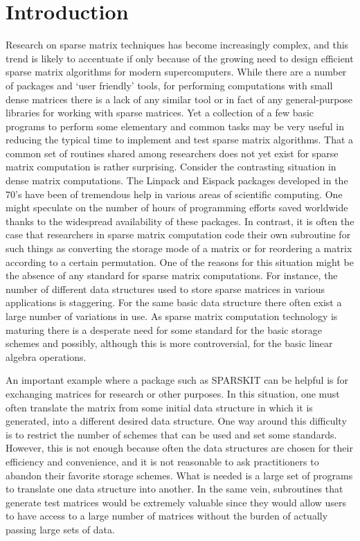 \documentclass[12pt]{article}
\begin{document}
\section{Introduction} Research   on   sparse  matrix   techniques  has  become
increasingly complex, and this trend is likely to accentuate if only
because  of the growing need 
to design efficient sparse matrix algorithms for modern supercomputers.   
While there  are a  number of packages and `user
friendly' tools, for  performing computations  with small dense
matrices there is a lack of any similar tool or in fact of any 
general-purpose libraries for 
working with sparse  matrices.   Yet a  collection of  a few  basic programs to
perform some elementary and  common tasks  may be  very useful  in reducing the
typical time to implement and test sparse matrix algorithms.   That a common 
set
of routines  shared  among  researchers  does not  yet exist for sparse matrix
computation is rather surprising.  Consider the contrasting  situation in dense
matrix computations.  The Linpack  and Eispack  packages developed  in the 70's
have been of tremendous  help in  various areas  of scientific  computing.  
One might speculate on the number of hours of programming efforts 
saved worldwide thanks to the widespread availability  of these  packages.
In contrast,  it is  often the case that  researchers in  sparse  matrix 
computation  
code their own subroutine for  such  things as converting the storage mode
of a matrix or for reordering a matrix
according to a certain permutation.  One of the  reasons for this situation
might be the absence of any standard for sparse
matrix computations.  For instance, the number of different data
structures used to store sparse matrices in various applications is
staggering.  For the same basic data structure there often exist a
large number of variations in use.  As sparse matrix computation
technology is maturing there is a desperate need for some standard for
the basic storage schemes and possibly, although this is more
controversial, for the basic linear algebra operations.  

An important example where a package such as SPARSKIT can be helpful is for
exchanging matrices for research or other purposes.  In this
situation, one must often translate the matrix from some initial data
structure in which it is generated, into a different desired data
structure.  One way around this difficulty is to restrict 
the number of schemes that can be used and set  some standards.
 However, this is not
enough because often the data structures are chosen for their
efficiency and convenience, and it is not reasonable to ask
practitioners to abandon their favorite storage schemes.  What is
needed is a large set of programs to translate one data structure into
another. In the same vein, subroutines that generate test matrices
would be extremely valuable since they would allow users to have
access to a large number of matrices without the burden of actually
passing large sets of data.
\end{document}
